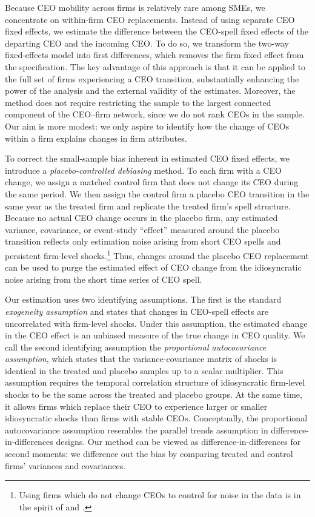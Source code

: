 \documentclass[11pt,a4paper]{article}
\begin{document}
Because CEO mobility across firms is relatively rare among SMEs, we concentrate on within-firm CEO replacements. Instead of using separate CEO fixed effects, we estimate the difference between the CEO-spell fixed effects of the departing CEO and the incoming CEO. To do so, we transform the two-way fixed-effects model into first differences, which removes the firm fixed effect from the specification. The key advantage of this approach is that it can be applied to the full set of firms experiencing a CEO transition, substantially enhancing the power of the analysis and the external validity of the estimates. Moreover, the method does not require restricting the sample to the largest connected component of the CEO–firm network, since we do not rank CEOs in the sample. Our aim is more modest: we only aspire to identify how the change of CEOs within a firm explains changes in firm attributes.

To correct the small-sample bias inherent in estimated CEO fixed effects, we introduce a \textit{placebo-controlled debiasing} method. To each firm with a CEO change, we assign a matched control firm that does not change its CEO during the same period. We then assign the control firm a placebo CEO transition in the same year as the treated firm and replicate the treated firm’s spell structure. Because no actual CEO change occurs in the placebo firm, any estimated variance, covariance, or event-study ``effect'' measured around the placebo transition reflects only estimation noise arising from short CEO spells and persistent firm-level shocks.\footnote{Using firms which do not change CEOs to control for noise in the data is in the spirit of \cite{fitza2014use} and \cite{jarosiewicz2023revisiting}.} Thus, changes around the placebo CEO replacement can be used to purge the estimated effect of CEO change from the idiosyncratic noise arising from the short time series of CEO spell.

Our estimation uses two identifying assumptions. The first is the standard \textit{exogeneity assumption} and states that changes in CEO-spell effects are uncorrelated with firm-level shocks. Under this assumption, the estimated change in the CEO effect is an unbiased measure of the true change in CEO quality. We call the second identifying assumption the \textit{proportional autocovariance assumption}, which states that the variance-covariance matrix of shocks is identical in the treated and placebo samples up to a scalar multiplier. This assumption requires the temporal correlation structure of idiosyncratic firm-level shocks to be the same across the treated and placebo groups. At the same time, it allows firms which replace their CEO to experience larger or smaller idiosyncratic shocks than firms with stable CEOs. Conceptually, the proportional autocovariance assumption resembles the parallel trends assumption in difference-in-differences designs. Our method can be viewed as difference-in-differences for second moments: we difference out the bias by comparing treated and control firms' variances and covariances.
\end{document}

